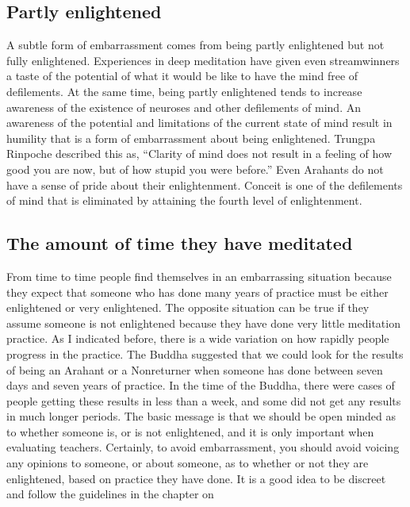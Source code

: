 \documentclass[a5paper,10pt,english]{book}
\begin{document}
\subsection{Partly enlightened}
\label{\detokenize{saints:partly-enlightened}}
\sphinxAtStartPar
A subtle form of embarrassment comes from being partly enlightened but
not fully enlightened. Experiences in deep meditation have given even
stream\sphinxhyphen{}winners a taste of the potential of what it would be like to have
the mind free of defilements. At the same time, being partly enlightened
tends to increase awareness of the existence of neuroses and other
defilements of mind. An awareness of the potential and limitations of
the current state of mind result in humility that is a form of
embarrassment about being enlightened. Trungpa Rinpoche described this
as, “Clarity of mind does not result in a feeling of how good you are
now, but of how stupid you were before.” Even Arahants do not have a
sense of pride about their enlightenment. Conceit is one of the
defilements of mind that is eliminated by attaining the fourth level of
enlightenment.


\subsection{The amount of time they have meditated}
\label{\detokenize{saints:the-amount-of-time-they-have-meditated}}
\sphinxAtStartPar
From time to time people find themselves in an embarrassing situation
because they expect that someone who has done many years of practice
must be either enlightened or very enlightened. The opposite situation
can be true if they assume someone is not enlightened because they have
done very little meditation practice. As I indicated before, there is a
wide variation on how rapidly people progress in the practice. The
Buddha suggested that we could look for the results of being an Arahant
or a Non\sphinxhyphen{}returner when someone has done between seven days and seven
years of practice. In the time of the Buddha, there were cases of people
getting these results in less than a week, and some did not get any
results in much longer periods. The basic message is that we should be
open minded as to whether someone is, or is not enlightened, and it is
only important when evaluating teachers. Certainly, to avoid
embarrassment, you should avoid voicing any opinions to someone, or
about someone, as to whether or not they are enlightened, based on
practice they have done. It is a good idea to be discreet and follow the
guidelines in the chapter on 
\end{document}

